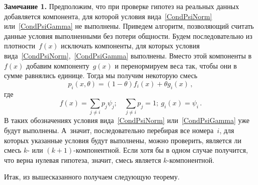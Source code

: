 \begin{multicols}{2}
\medskip

\noindent
\textbf{Замечание 1.} Предположим, что при проверке гипотез на реальных
данных добавляется компонента, для которой условия
вида~\eqref{CondPsiNorm} или~\eqref{CondPsiGamma} не выполнены.
Приведем алгоритм, позволяющий считать данные условия выполненными
без потери общности. Будем последовательно из плотности~$f(x)$
исключать компоненты, для которых условия
вида~\eqref{CondPsiNorm},~\eqref{CondPsiGamma}
выполнены. Вместо этой компоненты в~$f(x)$ добавим компоненту~$g(x)$
и перенормируем веса так, чтобы они в сумме равнялись единице. Тогда
мы получим некоторую смесь
\begin{equation*}
p_i(x,\theta)=(1-\theta) f_i(x)+\theta g_i(x)\,,
\end{equation*}
где
$$
f(x)=\sum\limits_{j\neq i}p_j\psi_j;\quad \sum\limits_{j\neq i}p_j=1;\  g_i(x)=\psi_i\,.
$$
В таких обозначениях условия вида~\eqref{CondPsiNorm}
или~\eqref{CondPsiGamma} уже будут выполнены. А~значит,
последовательно перебирая все номера~$i$, для которых указанные
условия будут выполнены, можно проверить, является ли смесь $k$- или
$(k+1)$-ком\-по\-нент\-ной. Если хотя бы в одном случае получится, что
верна нулевая гипотеза, значит, смесь является $k$-ком\-по\-нентной.

Итак, из вышесказанного получаем следующую теорему.

\medskip


\end{multicols}
